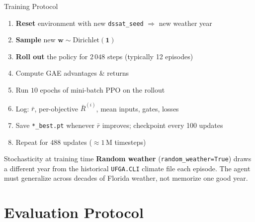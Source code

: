 \documentclass[10pt,aspectratio=169]{beamer}
\newcommand{\wvec}{\mathbf{w}}
\begin{document}
\begin{frame}{Training Protocol}
  \begin{enumerate}
    \item \textbf{Reset} environment with new \texttt{dssat\_seed} $\Rightarrow$ new weather year
    \item \textbf{Sample} new $\wvec \sim \mathrm{Dirichlet}(\mathbf{1})$
    \item \textbf{Roll out} the policy for $2\,048$ steps (typically 12 episodes)
    \item Compute GAE advantages \& returns
    \item Run $10$ epochs of mini-batch PPO on the rollout
    \item Log: $\bar r$, per-objective $\bar R^{(i)}$, mean inputs, gates, losses
    \item Save \texttt{*\_best.pt} whenever $\bar r$ improves; checkpoint every 100 updates
    \item Repeat for $488$ updates ($\approx 1$\,M timesteps)
  \end{enumerate}

  \vspace{0.7em}
  \begin{block}{Stochasticity at training time}
  \textbf{Random weather} (\texttt{random\_weather=True}) draws a different year from the historical
  \texttt{UFGA.CLI} climate file each episode. The agent must generalize across decades
  of Florida weather, not memorize one good year.
  \end{block}
\end{frame}

\section{Evaluation Protocol}
\end{document}
